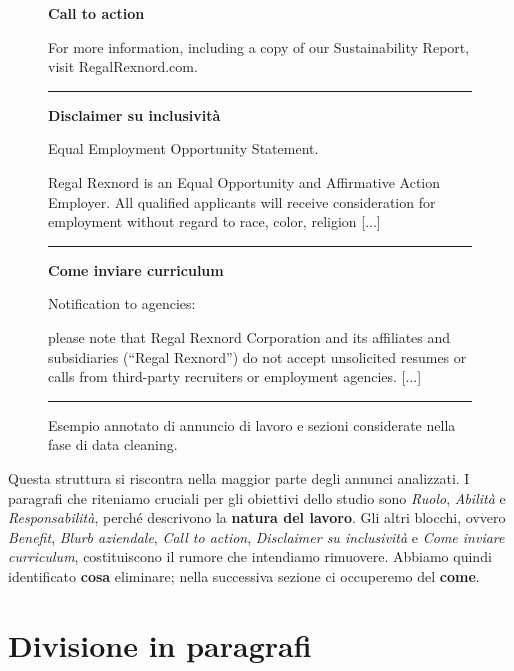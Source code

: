 \begin{figure}[H]
\begin{minipage}[t]{0.47\textwidth}
    \textbf{\textcolor{callToActionColor}{Call to action}}\par
    For more information, including a copy of our Sustainability Report, visit RegalRexnord.com.\par
    {\color{callToActionColor}\rule{\linewidth}{0.6pt}}\par\medskip

    \textbf{\textcolor{inclusivityColor}{Disclaimer su inclusività}}\par
    Equal Employment Opportunity Statement.\par\smallskip
    Regal Rexnord is an Equal Opportunity and Affirmative Action Employer. All qualified applicants will receive consideration for employment without regard to race, color, religion [...]\par
    {\color{inclusivityColor}\rule{\linewidth}{0.6pt}}\par\medskip

    \textbf{\textcolor{applicationColor}{Come inviare curriculum}}\par
    Notification to agencies:\par\smallskip
    please note that Regal Rexnord Corporation and its affiliates and subsidiaries (``Regal Rexnord'') do not accept unsolicited resumes or calls from third-party recruiters or employment agencies. [...]\par 
    {\color{applicationColor}\rule{\linewidth}{0.6pt}}\par\medskip
\end{minipage}

    \caption{Esempio annotato di annuncio di lavoro e sezioni considerate nella fase di data cleaning.}
    \label{fig:job-offer-example}
\end{figure}
\noindent Questa struttura si riscontra nella maggior parte degli annunci analizzati. I paragrafi che riteniamo cruciali per gli obiettivi dello studio sono \textit{Ruolo}, \textit{Abilità} e \textit{Responsabilità}, perché descrivono la \textbf{natura del lavoro}. Gli altri blocchi, ovvero \textit{Benefit}, \textit{Blurb aziendale}, \textit{Call to action}, \textit{Disclaimer su inclusività} e \textit{Come inviare curriculum}, costituiscono il rumore che intendiamo rimuovere. Abbiamo quindi identificato \textbf{cosa} eliminare; nella successiva sezione ci occuperemo del \textbf{come}.

\section{Divisione in paragrafi}

